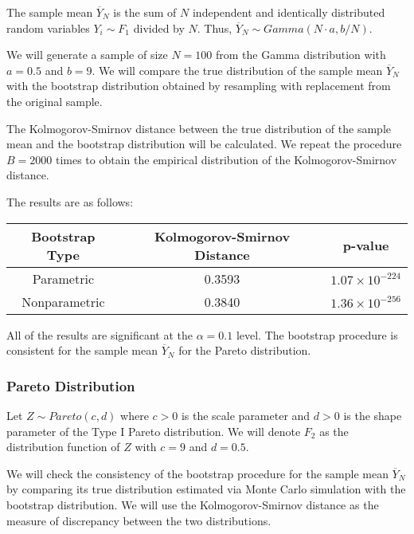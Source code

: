 \documentclass{article}
\begin{document}
The sample mean \(\overline{Y}_N\) is the sum of \(N\) independent and identically distributed random variables \(Y_i \sim F_1\) divided by \(N\). Thus, \(\overline{Y}_N \sim Gamma(N \cdot a, b / N)\).

We will generate a sample of size \(N = 100\) from the Gamma distribution with \(a = 0.5\) and \(b = 9\). We will compare the true distribution of the sample mean \(\overline{Y}_N\) with the bootstrap distribution obtained by resampling with replacement from the original sample.

The Kolmogorov-Smirnov distance between the true distribution of the sample mean and the bootstrap distribution will be calculated. We repeat the procedure \(B = 2000\) times to obtain the empirical distribution of the Kolmogorov-Smirnov distance.

The results are as follows:

\begin{table}[h]
\centering
\begin{tabular}{|c|c|c|}
\hline
\textbf{Bootstrap Type} & \textbf{Kolmogorov-Smirnov Distance} & \textbf{p-value} \\ \hline
Parametric & 0.3593 & \(1.07 \times 10^{-224}\) \\ \hline
Nonparametric & 0.3840 & \(1.36 \times 10^{-256}\) \\ \hline
\end{tabular}
\end{table}

All of the results are significant at the \(\alpha = 0.1\) level. The bootstrap procedure is consistent for the sample mean \(\overline{Y}_N\) for the Pareto distribution.


\subsubsection{Pareto Distribution}

Let \(Z \sim Pareto(c, d)\) where \(c > 0\) is the scale parameter and \(d > 0\) is the shape parameter of the Type I Pareto distribution. We will denote \(F_2\) as the distribution function of \(Z\) with \(c = 9\) and \(d = 0.5\).

We will check the consistency of the bootstrap procedure for the sample mean \(\overline{Y}_N\) by comparing its true distribution estimated via Monte Carlo simulation with the bootstrap distribution. We will use the Kolmogorov-Smirnov distance as the measure of discrepancy between the two distributions.
\end{document}
